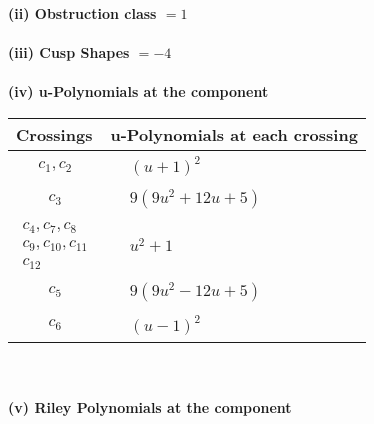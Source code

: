 \documentclass[1p]{elsarticle_modified}
\theoremstyle{definition}
\begin{document}
\flushleft \textbf{(ii) Obstruction class $= 1$}\\~\\
\flushleft \textbf{(iii) Cusp Shapes $= -4$}\\~\\
\newpage\renewcommand{\arraystretch}{1}
\flushleft \textbf{(iv) u-Polynomials at the component}\newline \\
\begin{tabular}{m{50pt}|m{274pt}}
Crossings & \hspace{64pt}u-Polynomials at each crossing \\
\hline $$\begin{aligned}c_{1},c_{2}\end{aligned}$$&$\begin{aligned}
&(u+1)^2
\end{aligned}$\\
\hline $$\begin{aligned}c_{3}\end{aligned}$$&$\begin{aligned}
&9(9 u^2+12 u+5)
\end{aligned}$\\
\hline $$\begin{aligned}c_{4},c_{7},c_{8}\\c_{9},c_{10},c_{11}\\c_{12}\end{aligned}$$&$\begin{aligned}
&u^2+1
\end{aligned}$\\
\hline $$\begin{aligned}c_{5}\end{aligned}$$&$\begin{aligned}
&9(9 u^2-12 u+5)
\end{aligned}$\\
\hline $$\begin{aligned}c_{6}\end{aligned}$$&$\begin{aligned}
&(u-1)^2
\end{aligned}$\\
\hline
\end{tabular}\\~\\
\newpage\renewcommand{\arraystretch}{1}
\flushleft \textbf{(v) Riley Polynomials at the component}\newline \\
\end{document}
